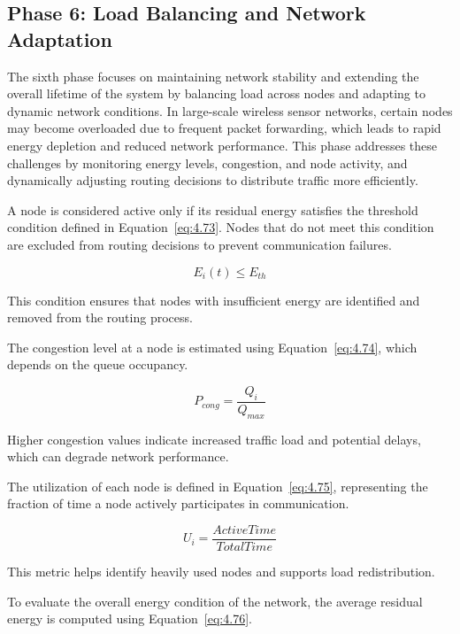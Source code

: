 \documentclass[a4paper,fleqn]{cas-dc}
\numberwithin{equation}{section}
\begin{document}
\subsection{Phase 6: Load Balancing and Network Adaptation}

The sixth phase focuses on maintaining network stability and extending the overall lifetime of the system by balancing load across nodes and adapting to dynamic network conditions. In large-scale wireless sensor networks, certain nodes may become overloaded due to frequent packet forwarding, which leads to rapid energy depletion and reduced network performance. This phase addresses these challenges by monitoring energy levels, congestion, and node activity, and dynamically adjusting routing decisions to distribute traffic more efficiently.

A node is considered active only if its residual energy satisfies the threshold condition defined in Equation~\ref{eq:4.73}. Nodes that do not meet this condition are excluded from routing decisions to prevent communication failures.

\begin{equation}
E_i(t) \leq E_{th}
\label{eq:4.73}
\end{equation}

This condition ensures that nodes with insufficient energy are identified and removed from the routing process.

The congestion level at a node is estimated using Equation~\ref{eq:4.74}, which depends on the queue occupancy.

\begin{equation}
P_{cong} = \frac{Q_i}{Q_{max}}
\label{eq:4.74}
\end{equation}

Higher congestion values indicate increased traffic load and potential delays, which can degrade network performance.

The utilization of each node is defined in Equation~\ref{eq:4.75}, representing the fraction of time a node actively participates in communication.

\begin{equation}
U_i = \frac{ActiveTime}{TotalTime}
\label{eq:4.75}
\end{equation}

This metric helps identify heavily used nodes and supports load redistribution.

To evaluate the overall energy condition of the network, the average residual energy is computed using Equation~\ref{eq:4.76}.
\end{document}
